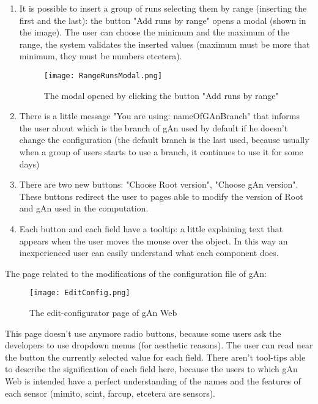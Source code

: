 \begin{enumerate}
\item It is possible to insert a group of runs selecting them by range (inserting the first and the last): the button "Add runs by range" opens a modal (shown in the image). The user can choose the minimum and the maximum of the range, the system validates the inserted values (maximum must be more that minimum, they must be numbers etcetera).

\begin{figure}[H]
\centering
\texttt{[image: RangeRunsModal.png]}  
\caption{The modal opened by clicking the button "Add runs by range"}
\end{figure}

\item There is a little message "You are using: nameOfGAnBranch" that informs the user about which is the branch of gAn used by default if he doesn't change the configuration (the default branch is the last used, because usually when a group of users starts to use a branch, it continues to use it for some days)

\item There are two new buttons: "Choose Root version", "Choose gAn version". These buttons redirect the user to pages able to modify the version of Root and gAn used in the computation.
 
\item Each button and each field have a tooltip: a little explaining text that appears when the user moves the mouse over the object. In this way an inexperienced user can easily understand what each component does.  

\end{enumerate}


The page related to the modifications of the configuration file of gAn:

\begin{figure}[H]
\centering
\texttt{[image: EditConfig.png]} 
\caption{The edit-configurator page of gAn Web}
\end{figure}

This page doesn't use anymore radio buttons, because some users ask the developers to use dropdown menus (for aesthetic reasons). The user can read near the button the currently selected value for each field. There aren't tool-tips able to describe the signification of each field here, because the users to which gAn Web is intended have a perfect understanding of the names and the features of each sensor (mimito, scint, farcup, etcetera are sensors).  



